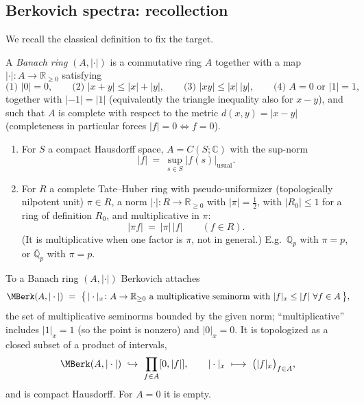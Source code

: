 \subsection{Berkovich spectra: recollection}
\label{subsec:22:berkovich-recollection}

We recall the classical definition to fix the target.

\begin{definition}
\label{def:22:banach-ring}
A \emph{Banach ring} $(A,|\cdot|)$ is a commutative ring $A$ together with a map
$|\cdot|\colon A\to\mathbb R_{\ge0}$ satisfying
\begin{equation*}
\text{(1) } |0|=0, \qquad
\text{(2) } |x+y|\le|x|+|y|, \qquad
\text{(3) } |xy|\le|x|\,|y|, \qquad
\text{(4) } A=0 \text{ or } |1|=1,
\end{equation*}
together with $|{-1}|=|1|$ (equivalently the triangle inequality also for
$x-y$), and such that $A$ is complete with respect to the metric
$d(x,y)=|x-y|$ (completeness in particular forces $|f|=0\iff f=0$).
\end{definition}

\begin{example}
\label{ex:22:banach-examples}
\leavevmode
\begin{enumerate}
\item For $S$ a compact Hausdorff space, $A=C(S;\mathbb C)$ with the sup-norm
\begin{equation*}
|f|\ =\ \sup_{s\in S}|f(s)|_{\mathrm{usual}} .
\end{equation*}
\item For $R$ a complete Tate--Huber ring with pseudo-uniformizer (topologically
nilpotent unit) $\pi\in R$, a norm $|\cdot|\colon R\to\mathbb R_{\ge0}$ with
$|\pi|=\tfrac12$, with $|R_0|\le1$ for a ring of definition $R_0$, and
multiplicative in $\pi$:
\begin{equation*}
|\pi f|\ =\ |\pi|\,|f| \qquad(f\in R).
\end{equation*}
(It is multiplicative when one factor is $\pi$, not in general.) E.g.\ $\mathbb
Q_p$ with $\pi=p$, or $\overline{\mathbb Q}_p$ with $\pi=p$.
\end{enumerate}
\end{example}

\begin{definition}
\label{def:22:berkovich-spectrum}
To a Banach ring $(A,|\cdot|)$ Berkovich attaches
\begin{equation}
\label{eq:22:berkovich}
\MBerk(A,|\cdot|)\ =\ \bigl\{\,|\cdot|_x\colon A\to\mathbb R_{\ge0}\ \text{a
multiplicative seminorm with } |f|_x\le|f|\ \forall f\in A\,\bigr\},
\end{equation}
the set of multiplicative seminorms bounded by the given norm; ``multiplicative''
includes $|1|_x=1$ (so the point is nonzero) and $|0|_x=0$. It is topologized as
a closed subset of a product of intervals,
\begin{equation*}
\MBerk(A,|\cdot|)\ \hookrightarrow\ \prod_{f\in A}[0,|f|],\qquad
|\cdot|_x\ \longmapsto\ \bigl(|f|_x\bigr)_{f\in A},
\end{equation*}
and is compact Hausdorff. For $A=0$ it is empty.
\end{definition}

